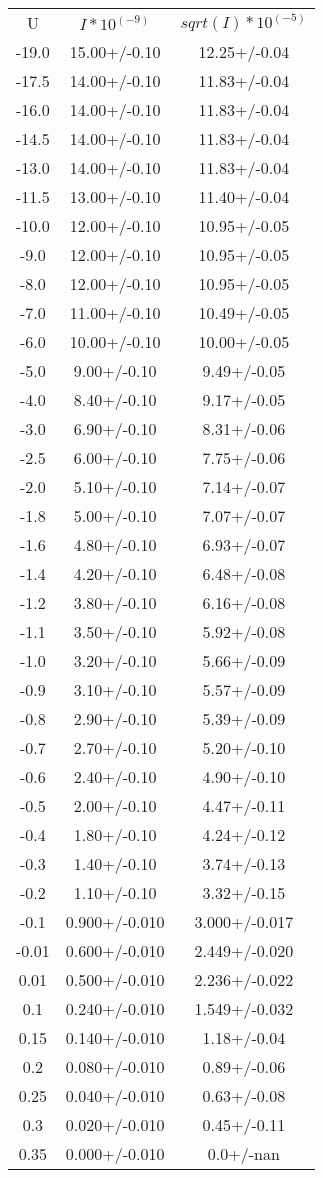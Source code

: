 \begin{table}
\begin{tabular}{ccc}
U & $I*10^(-9)$ & $sqrt(I)*10^(-5)$ \\
-19.0 & 15.00+/-0.10 & 12.25+/-0.04 \\
-17.5 & 14.00+/-0.10 & 11.83+/-0.04 \\
-16.0 & 14.00+/-0.10 & 11.83+/-0.04 \\
-14.5 & 14.00+/-0.10 & 11.83+/-0.04 \\
-13.0 & 14.00+/-0.10 & 11.83+/-0.04 \\
-11.5 & 13.00+/-0.10 & 11.40+/-0.04 \\
-10.0 & 12.00+/-0.10 & 10.95+/-0.05 \\
-9.0 & 12.00+/-0.10 & 10.95+/-0.05 \\
-8.0 & 12.00+/-0.10 & 10.95+/-0.05 \\
-7.0 & 11.00+/-0.10 & 10.49+/-0.05 \\
-6.0 & 10.00+/-0.10 & 10.00+/-0.05 \\
-5.0 & 9.00+/-0.10 & 9.49+/-0.05 \\
-4.0 & 8.40+/-0.10 & 9.17+/-0.05 \\
-3.0 & 6.90+/-0.10 & 8.31+/-0.06 \\
-2.5 & 6.00+/-0.10 & 7.75+/-0.06 \\
-2.0 & 5.10+/-0.10 & 7.14+/-0.07 \\
-1.8 & 5.00+/-0.10 & 7.07+/-0.07 \\
-1.6 & 4.80+/-0.10 & 6.93+/-0.07 \\
-1.4 & 4.20+/-0.10 & 6.48+/-0.08 \\
-1.2 & 3.80+/-0.10 & 6.16+/-0.08 \\
-1.1 & 3.50+/-0.10 & 5.92+/-0.08 \\
-1.0 & 3.20+/-0.10 & 5.66+/-0.09 \\
-0.9 & 3.10+/-0.10 & 5.57+/-0.09 \\
-0.8 & 2.90+/-0.10 & 5.39+/-0.09 \\
-0.7 & 2.70+/-0.10 & 5.20+/-0.10 \\
-0.6 & 2.40+/-0.10 & 4.90+/-0.10 \\
-0.5 & 2.00+/-0.10 & 4.47+/-0.11 \\
-0.4 & 1.80+/-0.10 & 4.24+/-0.12 \\
-0.3 & 1.40+/-0.10 & 3.74+/-0.13 \\
-0.2 & 1.10+/-0.10 & 3.32+/-0.15 \\
-0.1 & 0.900+/-0.010 & 3.000+/-0.017 \\
-0.01 & 0.600+/-0.010 & 2.449+/-0.020 \\
0.01 & 0.500+/-0.010 & 2.236+/-0.022 \\
0.1 & 0.240+/-0.010 & 1.549+/-0.032 \\
0.15 & 0.140+/-0.010 & 1.18+/-0.04 \\
0.2 & 0.080+/-0.010 & 0.89+/-0.06 \\
0.25 & 0.040+/-0.010 & 0.63+/-0.08 \\
0.3 & 0.020+/-0.010 & 0.45+/-0.11 \\
0.35 & 0.000+/-0.010 & 0.0+/-nan \\
\end{tabular}
\end{table}
